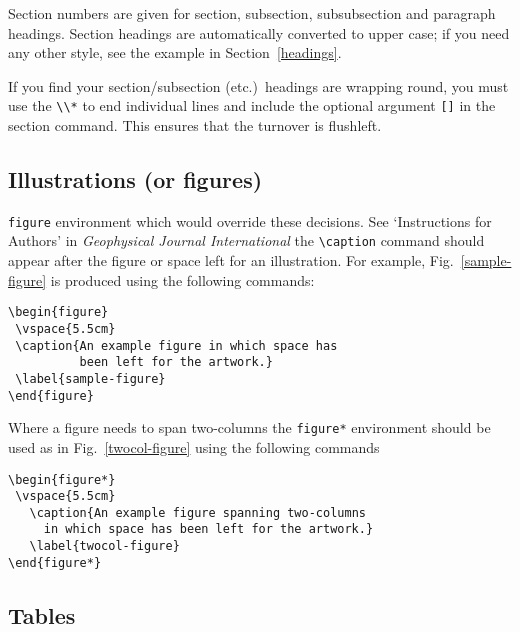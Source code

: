 Section numbers are given for section, subsection, subsubsection and paragraph
headings. Section headings are automatically converted to upper case; if you
need any other style, see the example in Section~\ref{headings}.

If you find your section/subsection (etc.)\ headings are wrapping round, you
must use the \verb"\\*" to end individual lines and include the optional
argument \verb"[]" in the section command. This ensures that the turnover is
flushleft.

\subsection{Illustrations (or figures)}

\begin{figure*}
 \vspace{5.5cm}
  \caption{An example figure spanning two-columns in which space has been left
  for the artwork.}\label{twocol-figure}
\end{figure*}

\verb"figure" environment which would override these decisions. See
`Instructions for Authors' in {\em Geophysical Journal International\/}
the \verb"\caption" command should appear after the figure or space
left for an illustration. For example, Fig.~\ref{sample-figure} is
produced using the following commands:
\begin{verbatim}
\begin{figure}
 \vspace{5.5cm}
 \caption{An example figure in which space has
          been left for the artwork.}
 \label{sample-figure}
\end{figure}
\end{verbatim}

Where a figure needs to span two-columns the \verb"figure*" environment
should be used as in  Fig.~\ref{twocol-figure} using the following commands
\begin{verbatim}
\begin{figure*}
 \vspace{5.5cm}
   \caption{An example figure spanning two-columns
     in which space has been left for the artwork.}
   \label{twocol-figure}
\end{figure*}
\end{verbatim}

\subsection{Tables}

